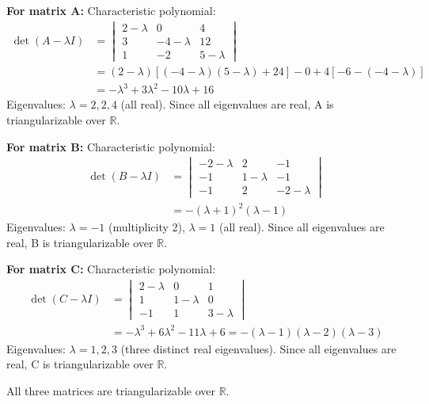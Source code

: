 \documentclass[12pt]{article}
\begin{document}
\begin{correctionbox}
\textbf{For matrix A:}
Characteristic polynomial: 
\begin{align*}
\det(A-\lambda I) &= \begin{vmatrix}
2-\lambda & 0 & 4 \\
3 & -4-\lambda & 12 \\
1 & -2 & 5-\lambda
\end{vmatrix} \\
&= (2-\lambda)[(-4-\lambda)(5-\lambda) + 24] - 0 + 4[-6 - (-4-\lambda)] \\
&= -\lambda^3 + 3\lambda^2 - 10\lambda + 16
\end{align*}
Eigenvalues: $\lambda = 2, 2, 4$ (all real). Since all eigenvalues are real, A is triangularizable over $\mathbb{R}$.

\textbf{For matrix B:}
Characteristic polynomial:
\begin{align*}
\det(B-\lambda I) &= \begin{vmatrix}
-2-\lambda & 2 & -1 \\
-1 & 1-\lambda & -1 \\
-1 & 2 & -2-\lambda
\end{vmatrix} \\
&= -(\lambda+1)^2(\lambda-1)
\end{align*}
Eigenvalues: $\lambda = -1$ (multiplicity 2), $\lambda = 1$ (all real). Since all eigenvalues are real, B is triangularizable over $\mathbb{R}$.

\textbf{For matrix C:}
Characteristic polynomial:
\begin{align*}
\det(C-\lambda I) &= \begin{vmatrix}
2-\lambda & 0 & 1 \\
1 & 1-\lambda & 0 \\
-1 & 1 & 3-\lambda
\end{vmatrix} \\
&= -\lambda^3 + 6\lambda^2 - 11\lambda + 6 = -(\lambda-1)(\lambda-2)(\lambda-3)
\end{align*}
Eigenvalues: $\lambda = 1, 2, 3$ (three distinct real eigenvalues). Since all eigenvalues are real, C is triangularizable over $\mathbb{R}$.

All three matrices are triangularizable over $\mathbb{R}$.
\end{correctionbox}

\end{document}
